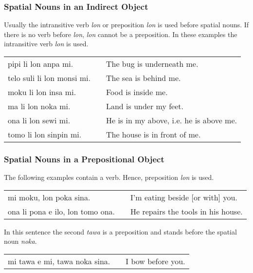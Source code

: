 %
\subsubsection*{Spatial Nouns in an Indirect Object}
%
%
%

Usually the intransitive verb \textit{lon} or preposition \textit{lon} is used before spatial nouns. 
If there is no verb before \textit{lon}, \textit{lon} cannot be a preposition. 
In these examples the intransitive verb \textit{lon} is used.

\begin{supertabular}{p{5,5cm}|ll}
pipi li lon anpa mi.       && The bug is underneath me. \\
telo suli li lon monsi mi. && The sea is behind me.  \\
moku li lon insa mi.       && Food is inside me. \\
ma li lon noka mi.         && Land is under my feet. \\
ona li lon sewi mi.        && He is in my above, i.e. he is above me. \\
tomo li lon sinpin mi.     && The house is in front of me. \\
\end{supertabular} 

%
\subsubsection*{Spatial Nouns in a Prepositional Object}
%
%

The following examples contain a verb. 
Hence, preposition \textit{lon} is used. 

\begin{supertabular}{p{5,5cm}|ll}
mi moku, lon poka sina.    && I'm eating beside [or with] you. \\
ona li pona e ilo, lon tomo ona. && He repairs the tools in his house. \\
\end{supertabular} 

In this sentence the second \textit{tawa} is a preposition and stands before the spatial noun \textit{noka}. 

\begin{supertabular}{p{5,5cm}|ll}
mi tawa e mi, tawa noka sina. && I bow before you. \\
\end{supertabular} 


